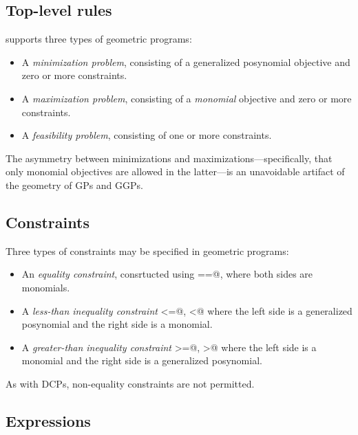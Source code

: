 \documentclass[12pt]{article}
\begin{document}
\subsection{Top-level rules}

\cvx supports three types of geometric programs:
\begin{itemize}
\item A \emph{minimization problem}, consisting of a generalized posynomial objective and
zero or more constraints.
\item A \emph{maximization problem}, consisting of a \emph{monomial} objective and
zero or more constraints.
\item A \emph{feasibility problem}, consisting of one or more constraints.
\end{itemize}
The asymmetry between minimizations and maximizations---specifically, that only monomial
objectives are allowed in the latter---is an unavoidable artifact of
the geometry of GPs and GGPs.

\subsection{Constraints}

Three types of constraints may be specified in geometric programs:
\begin{itemize}
\item An \emph{equality constraint}, consrtucted using \verb@==@,
where both sides are monomials.
\item A \emph{less-than inequality constraint} \verb@<=@, \verb@<@ 
where the left side is a generalized posynomial and the right side is a monomial.
\item A \emph{greater-than inequality constraint} \verb@>=@, \verb@>@ 
where the left side is a monomial and the right side is a generalized posynomial.
\end{itemize}
As with DCPs, non-equality constraints are not permitted.

\subsection{Expressions}
\label{sec:gp-expressions}
\end{document}
